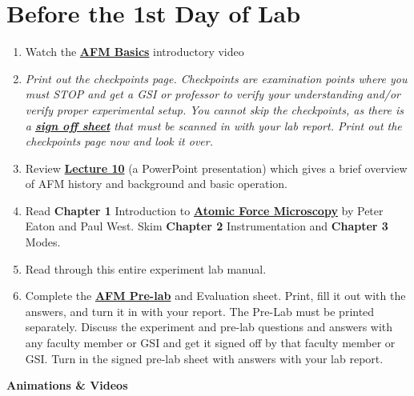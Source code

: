 \documentclass{../lab}
\begin{document}
\section{Before the 1st Day of Lab }

\begin{enumerate}
    \item Watch the \href{http://experimentationlab.berkeley.edu/sites/default/files/Introduction\%20Video.mp4}{\textbf{AFM Basics}} introductory video

    \item \emph{Print out the checkpoints page. Checkpoints are examination points where you must STOP and get a GSI or professor to verify your understanding and/or verify proper experimental setup. You cannot skip the checkpoints, as there is a \href{http://experimentationlab.berkeley.edu/node/136}{\textbf{sign off sheet}} that must be scanned in with your lab report. Print out the checkpoints page now and look it over.}

    \item Review \href{http://experimentationlab.berkeley.edu/sites/default/files/AFMImages/Lecture\_10\_AFM.pdf}{\textbf{Lecture 10}} (a PowerPoint presentation) which gives a brief overview of AFM history and background and basic operation.

    \item Read \textbf{Chapter 1} Introduction to \href{http://experimentationlab.berkeley.edu/afm-book}{\textbf{Atomic Force Microscopy}} by Peter Eaton and Paul West. Skim \textbf{Chapter 2} Instrumentation and \textbf{Chapter 3} Modes.

    \item Read through this entire experiment lab manual.

    \item Complete the \href{http://experimentationlab.berkeley.edu/node/122}{\textbf{AFM Pre-lab}} and Evaluation sheet. Print, fill it out with the answers, and turn it in with your report. The Pre-Lab must be printed separately. Discuss the experiment and pre-lab questions and answers with any faculty member or GSI and get it signed off by that faculty member or GSI. Turn in the signed pre-lab sheet with answers with your lab report.

\end{enumerate}

\pagebreak

\textbf{Animations \& Videos}
\end{document}
